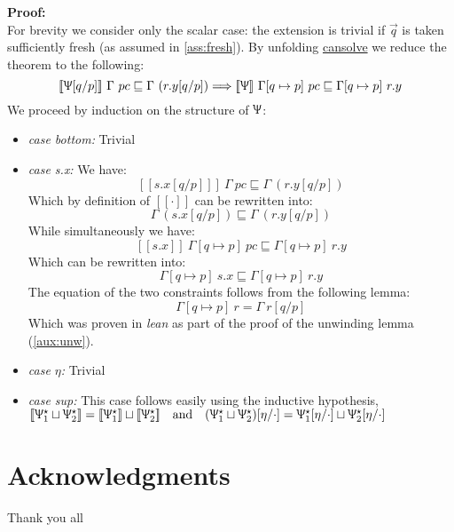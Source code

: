 \documentclass[12pt,a4paper,twoside]{book}
\newcommand{\llbracket}{[\![}
\newcommand{\rrbracket}{]\!]}
\begin{document}
\begin{appendices}
\noindent\textbf{Proof:}\\
For brevity we consider only the scalar case: the extension is trivial if $\vec{q}$ is taken sufficiently fresh (as assumed in \ref{ass:fresh}). By unfolding \underline{cansolve} we reduce the theorem to the following:
$$
\llbracket \Uppsi[q/p]\rrbracket~\Gamma~pc \sqsubseteq \Gamma~(r.y[q/p])
\Longrightarrow \llbracket \Uppsi\rrbracket~\Gamma[q\mapsto p]~pc \sqsubseteq \Gamma[q\mapsto p]~r.y
$$
We proceed by induction on the structure of $\Uppsi$:
\begin{itemize}
\item \emph{case bottom:} Trivial
\item \emph{case s.x:} We have:
$$
\llbracket s.x[q/p]\rrbracket~\Gamma~pc \sqsubseteq \Gamma~(r.y[q/p])
$$
Which by definition of $\llbracket \cdot \rrbracket$ can be rewritten into:
$$
\Gamma~(s.x[q/p]) \sqsubseteq \Gamma~(r.y[q/p])
$$
While simultaneously we have:
$$
\llbracket s.x\rrbracket~\Gamma[q\mapsto p]~pc \sqsubseteq \Gamma[q\mapsto p]~r.y
$$
Which can be rewritten into:
$$
\Gamma[q\mapsto p]~s.x \sqsubseteq \Gamma[q\mapsto p]~r.y
$$
The equation of the two constraints follows from the following lemma:
$$
\Gamma[q\mapsto p]~r = \Gamma~r[q/p]
$$
Which was proven in \emph{lean} as part of the proof of the unwinding lemma (\ref{aux:unw}).

\item \emph{case $\eta$:} Trivial
\item \emph{case sup:} This case follows easily using the inductive hypothesis,\\
$\llbracket \Uppsi_1^\star \sqcup \Uppsi_2^\star \rrbracket = 
\llbracket \Uppsi_1^\star \rrbracket \sqcup \llbracket \Uppsi_2^\star \rrbracket \quad\text{and}\quad
(\Uppsi_1^\star \sqcup \Uppsi_2^\star)[\eta/\cdot]= 
\Uppsi_1^\star [\eta/\cdot]\sqcup \Uppsi_2^\star[\eta/\cdot]$
\end{itemize}

\end{appendices}





\chapter*{Acknowledgments}
Thank you all
\end{document}
